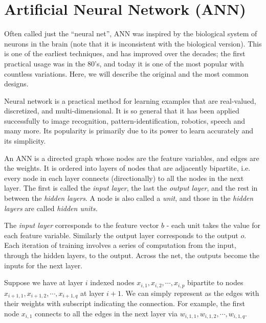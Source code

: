 \documentclass[12pt]{article}  %
\begin{document}



\section{Artificial Neural Network (ANN)}

Often called just the ``neural net'', ANN was inspired by the biological system of neurons in the brain (note that it is inconsistent with the biological version). This is one of the earliest techniques, and has improved over the decades; the first practical usage was in the 80's, and today it is one of the most popular with countless variations. Here, we will describe the original and the most common designs.

Neural network is a practical method for learning examples that are real-valued, discretized, and multi-dimensional. It is so general that it has been applied successfully to image recognition, pattern-identification, robotics, speech and many more. Its popularity is primarily due to its power to learn accurately and its simplicity.

An ANN is a directed graph whose nodes are the feature variables, and edges are the weights. It is ordered into layers of nodes that are adjacently bipartite, i.e. every node in each layer connects (directionally) to all the nodes in the next layer. The first is called the {\em input layer}, the last the {\em output layer}, and the rest in between the {\em hidden layers}. A node is also called a {\em unit}, and those in the {\em hidden layers} are called {\em hidden units.}

The {\em input layer} corresponds to the feature vector $b$ - each unit takes the value for each feature variable. Similarly the output layer corresponds to the output $o$. Each iteration of training involves a series of computation from the input, through the hidden layers, to the output. Across the net, the outputs become the inputs for the next layer.

Suppose we have at layer $i$ indexed nodes $x_{i,1}, x_{i,2}, \cdots, x_{i,p}$ bipartite to nodes $x_{i+1,1}, x_{i+1,2}, \cdots, x_{i+1,q}$ at layer $i+1$. We can simply represent as the edges with their weights with subscript indicating the connection. For example, the first node $x_{i,1}$ connects to all the edges in the next layer via $w_{i,1,1}, w_{i,1,2}, \cdots, w_{i,1,q}$.
\end{document}
